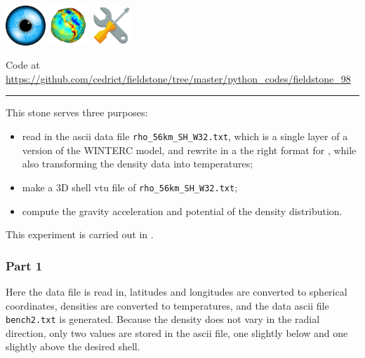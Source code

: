 \includegraphics[height=1.5cm]{images/pictograms/visualisation}
\includegraphics[height=1.5cm]{images/pictograms/gravity}
\includegraphics[height=1.5cm]{images/pictograms/tools}




\begin{center}
Code at \url{https://github.com/cedrict/fieldstone/tree/master/python_codes/fieldstone_98}
\end{center}

\par\noindent\rule{\textwidth}{0.4pt}


This stone serves three purposes:
\begin{itemize}
\item read in the ascii data file {\tt rho\_56km\_SH\_W32.txt}, which is a 
single layer of a version of the WINTERC model, and rewrite in a the right format 
for \aspect{}, while also transforming the density data into temperatures;
\item make a 3D shell vtu file of {\tt rho\_56km\_SH\_W32.txt};
\item compute the gravity acceleration and potential of the density distribution. 
\end{itemize}
This experiment is carried out in \textcite{ross22}.

\subsubsection*{Part 1}

Here the data file is read in, latitudes and longitudes are 
converted to spherical coordinates, densities
are converted to temperatures, and the \aspect{} data ascii
file {\tt bench2.txt} is generated.
Because the density does not vary in the radial direction, only two values are stored in the ascii file, 
one slightly below and one slightly above the desired shell.


